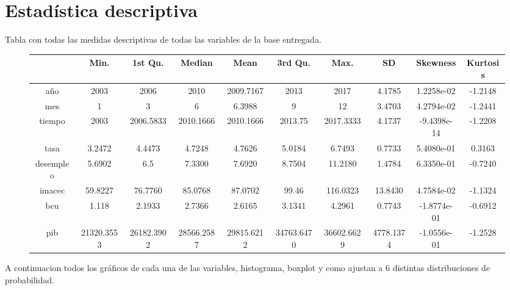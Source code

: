 \documentclass{article}
\begin{document}
\section*{Estadística descriptiva}
Tabla con todas las medidas descriptivas de todas las variables de la base entregada.
\begin{figure}[h!]
\begin{adjustwidth}{-2cm}{}
\begin{tabular}{|c|c|c|c|c|c|c|c|c|c|}
\hline
           & Min.&      1st Qu. &      Median  &       Mean &     3rd Qu. &        Max. &          SD   &   Skewness &  Kurtosis\\
\hline
año       & 2003 & 2006 & 2010 & 2009.7167 & 2013 & 2017  &  4.1785  &1.2258e-02 &-1.2148\\
\hline
mes      &     1  &   3 &    6 &    6.3988 &    9   & 12  &  3.4703  &4.2794e-02& -1.2441\\
\hline
tiempo  &   2003 & 2006.5833 & 2010.1666 & 2010.1666 & 2013.75 &2017.3333  & 4.1737 &-9.4398e-14 &-1.2208\\
\hline
tasa   &       3.2472 &    4.4473  &   4.7248 &    4.7626 &    5.0184  &   6.7493   & 0.7733 & 5.4080e-01 & 0.3163\\
\hline
desempleo    & 5.6902 &    6.5  &  7.3300 &    7.6920  &   8.7504  &  11.2180   & 1.4784  &6.3350e-01 &-0.7240\\
\hline
imacec      & 59.8227 &   76.7760   & 85.0768 &   87.0702  &  99.46  & 116.0323  & 13.8430 & 4.7584e-02 &-1.1324\\
\hline
bcu        &   1.118 &    2.1933   &  2.7366 &    2.6165  &   3.1341 &    4.2961   & 0.7743 &-1.8774e-01& -0.6912\\
\hline
pib       &21320.3553& 26182.3902& 28566.2587& 29815.6212 &34763.6470 &36602.6629 &4778.1374 &-1.0556e-01 &-1.2528\\
\hline
\end{tabular}
\end{adjustwidth}
\end{figure}
A continuacion todos los gráficos de cada una de las variables, histograma, boxplot y como ajustan a 6 distintas distribuciones de probabilidad.
\end{document}
